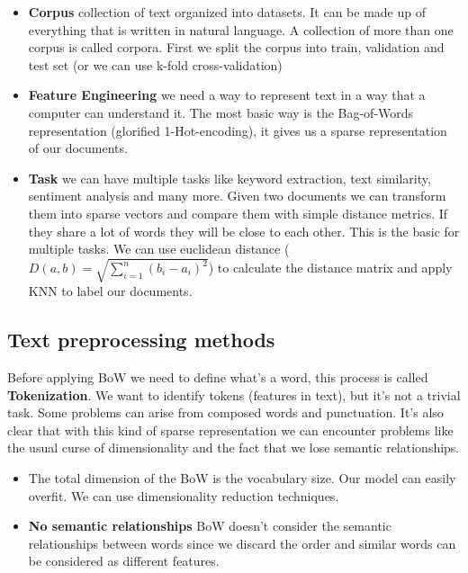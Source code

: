 \begin{itemize}
    \item \textbf{Corpus} \ra collection of text organized into datasets. It can be made up of everything that is written in natural language. A collection of more than one corpus is called corpora. First we split the corpus into train, validation and test set (or we can use k-fold cross-validation)
    \item \textbf{Feature Engineering} \ra we need a way to represent text in a way that a computer can understand it. The most basic way is the Bag-of-Words representation (glorified 1-Hot-encoding), it gives us a sparse representation of our documents.
    \item \textbf{Task} \ra we can have multiple tasks like keyword extraction, text similarity, sentiment analysis and many more. Given two documents we can transform them into sparse vectors and compare them with simple distance metrics. If they share a lot of words they will be close to each other. This is the basic for multiple tasks. We can use euclidean distance ($D(a,b) = \sqrt{\sum_{i=1}^{n}(b_i-a_i)^2}$) to calculate the distance matrix and apply KNN to label our documents.
\end{itemize}


\subsection{Text preprocessing methods}

Before applying BoW we need to define what's a word, this process is called \textbf{Tokenization}. We want to identify tokens (features in text), but it's not a trivial task. Some problems can arise from composed words and punctuation. It's also clear that with this kind of sparse representation we can encounter problems like the usual curse of dimensionality and the fact that we lose semantic relationships.

\begin{itemize}
    \item {} \ra The total dimension of the BoW is the vocabulary size. Our model can easily overfit. We can use dimensionality reduction techniques.
    \item \textbf{No semantic relationships} \ra BoW doesn't consider the semantic relationships between words since we discard the order and similar words can be considered as different features. 
\end{itemize}

